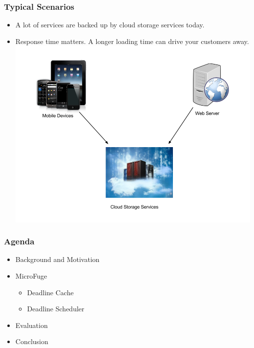 \documentclass{beamer}
\begin{document}
\begin{frame}
  \frametitle{Typical Scenarios}
  \begin{itemize}
  \item A lot of services are backed up by cloud storage services today.
  \item Response time matters. A longer loading time can drive your customers away.
    \includegraphics[scale=0.26]{img/A_Cloud_Example.png}
  \end{itemize}
\end{frame}


\begin{frame}
  \frametitle{Agenda}
  \begin{itemize}
  \item[\Checkmark] Background and Motivation
  \item MicroFuge
    \begin{itemize}
    \item Deadline Cache
    \item Deadline Scheduler
    \end{itemize}
  \item Evaluation
  \item Conclusion
  \end{itemize}
\end{frame}
\end{document}
